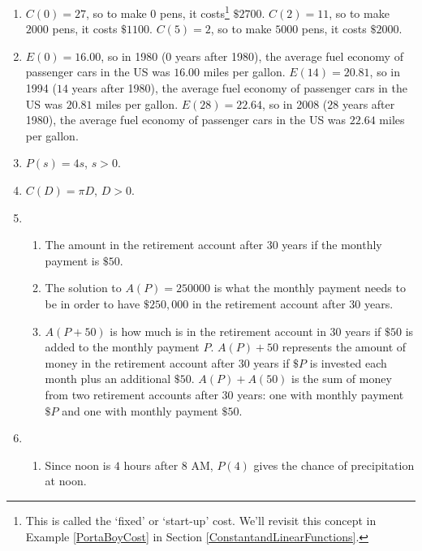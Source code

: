 \begin{enumerate}
\item $C(0) = 27$, so to make $0$ pens, it costs\footnote{This is called the `fixed' or `start-up' cost.  We'll revisit this concept in Example \ref{PortaBoyCost} in Section \ref{ConstantandLinearFunctions}.} $\$ 2700$.  $C(2) = 11$, so to make $2000$ pens, it costs $\$1100$.  $C(5) = 2$, so to make $5000$ pens, it costs $\$2000$.

\item $E(0) = 16.00$, so in 1980 ($0$ years after 1980), the average fuel economy of passenger cars in the US was $16.00$ miles per gallon.  $E(14) = 20.81$, so in 1994 ($14$ years after 1980), the average fuel economy of passenger cars in the US was $20.81$ miles per gallon.  $E(28) = 22.64$, so in 2008 ($28$ years after 1980), the average fuel economy of passenger cars in the US was $22.64$ miles per gallon.  


\item  $P(s) = 4s$, $s > 0$.

\item  $C(D) = \pi D$,  $D > 0$.

\item

\begin{enumerate}

\item The amount in the retirement account after 30 years if the monthly payment is $\$50$.

\item  The solution to $A(P) = 250000$ is what the monthly payment needs to be in order to have $\$250,\!000$ in the retirement account after 30 years.

\item  $A(P+50)$ is how much is in the retirement account in 30 years if $\$ 50$ is added to the monthly payment $P$.  $A(P)+50$ represents the amount of money in the retirement account after 30 years if $\$P$  is invested each month plus an additional $\$50$.  $A(P)+A(50)$ is the sum of money from two retirement accounts after 30 years: one with monthly payment $\$P$ and one with monthly payment $\$50$.

\end{enumerate}

\item  

\begin{enumerate}

\item  Since noon is $4$ hours after 8 AM, $P(4)$ gives the chance of precipitation at noon.


\end{enumerate}
\end{enumerate}
